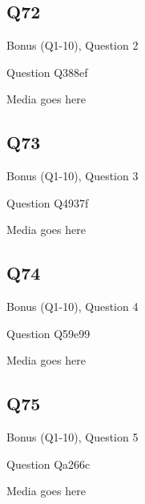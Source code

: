\documentclass[11pt]{beamer}
\begin{document}
\subsection*{Q72}
\begin{frame}[t]{Bonus (Q1-10), Question 2}
\vspace{2em}
\begin{block}{Question}
Q388ef
\end{block}
\begin{center}
Media goes here
\end{center}
\end{frame}
    

\subsection*{Q73}
\begin{frame}[t]{Bonus (Q1-10), Question 3}
\vspace{2em}
\begin{block}{Question}
Q4937f
\end{block}
\begin{center}
Media goes here
\end{center}
\end{frame}
    

\subsection*{Q74}
\begin{frame}[t]{Bonus (Q1-10), Question 4}
\vspace{2em}
\begin{block}{Question}
Q59e99
\end{block}
\begin{center}
Media goes here
\end{center}
\end{frame}
    

\subsection*{Q75}
\begin{frame}[t]{Bonus (Q1-10), Question 5}
\vspace{2em}
\begin{block}{Question}
Qa266c
\end{block}
\begin{center}
Media goes here
\end{center}
\end{frame}
    
\end{document}
